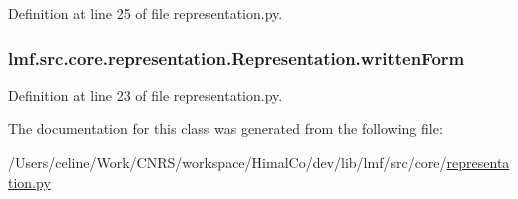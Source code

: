 Definition at line 25 of file representation.\+py.

\hypertarget{classlmf_1_1src_1_1core_1_1representation_1_1_representation_a3966cc4e61369fde0e86dda8a656a0e1}{
\subsubsection[{written\+Form}]{\setlength{\rightskip}{0pt plus 5cm}lmf.\+src.\+core.\+representation.\+Representation.\+written\+Form}}\label{classlmf_1_1src_1_1core_1_1representation_1_1_representation_a3966cc4e61369fde0e86dda8a656a0e1}


Definition at line 23 of file representation.\+py.



The documentation for this class was generated from the following file\+:\begin{DoxyCompactItemize}
\item 
/\+Users/celine/\+Work/\+C\+N\+R\+S/workspace/\+Himal\+Co/dev/lib/lmf/src/core/\hyperlink{representation_8py}{representation.\+py}\end{DoxyCompactItemize}
